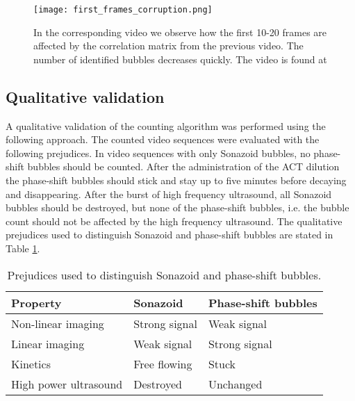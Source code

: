 \begin{figure}[h]
	\centering
	\texttt{[image: first\_frames\_corruption.png]}
	\cprotect\caption{In the corresponding video we observe how the first 10-20 frames are affected by the correlation matrix from the previous video. The number of identified bubbles decreases quickly. The video is found at }
	\label{Fig:first_frames}
\end{figure}

\subsection{Qualitative validation}
\label{sec:qualitative}
A qualitative validation of the counting algorithm was performed using the following approach. The counted video sequences were evaluated with the following prejudices. In video sequences with only Sonazoid\texttrademark{} bubbles, no phase-shift bubbles should be counted. After the administration of the ACT\texttrademark{} dilution the phase-shift bubbles should stick and stay up to five minutes before decaying and disappearing. After the burst of high frequency ultrasound, all Sonazoid\texttrademark{} bubbles should be destroyed, but none of the phase-shift bubbles, i.e. the bubble count should not be affected by the high frequency ultrasound. The qualitative prejudices used to distinguish Sonazoid\texttrademark{} and phase-shift bubbles are stated in Table \ref{tab:qualitative}.


\begin{table}[H]
\caption{Prejudices used to distinguish Sonazoid\texttrademark{} and phase-shift bubbles.}
\label{tab:qualitative}
\begin{center}
\begin{tabular}{@{}l l l @{}}
  \toprule
  Property & Sonazoid\texttrademark{} & Phase-shift bubbles \\
  \midrule
  Non-linear imaging & Strong signal & Weak signal \\
  Linear imaging & Weak signal & Strong signal \\
  Kinetics & Free flowing & Stuck \\
  High power ultrasound & Destroyed &Unchanged\\
  \bottomrule
\end{tabular}
\end{center}
\end{table}


